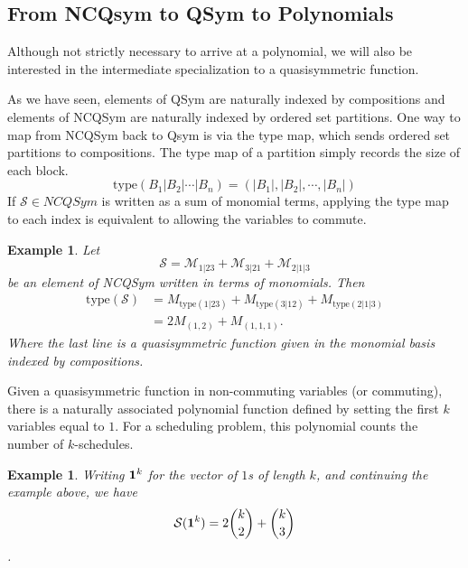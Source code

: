 \documentclass[12pt,reqno]{amsart}
\numberwithin{definition}{section}
\newtheorem{remark}[definition]{Remark}
\newtheorem{example}[definition]{Example}
\newcommand{\ncM}{\mathcal{M}}
\begin{document}


\subsection{From NCQsym to QSym to Polynomials}
Although not strictly necessary to arrive at a polynomial, we will also be interested in the intermediate specialization to a quasisymmetric function.  


As we have seen, elements of QSym are naturally indexed by
compositions and elements of NCQSym are naturally indexed by ordered
set partitions.  
One way to map from NCQSym back to Qsym is via the type map, which sends ordered set partitions to compositions.
The type map of a partition simply records the size of each block.
$$\textrm{type}(B_1|B_2|\cdots|B_n) = (|B_1|, |B_2|, \cdots, |B_n|)$$
If $\mathcal{S} \in NCQSym$ is written as a sum of monomial terms,
applying the type map to each index is equivalent to allowing the
variables to commute.

\begin{example}
Let $$\mathcal{S} = \ncM_{1|23} + \ncM_{3|21} + \ncM_{2|1|3}$$ be an element of NCQSym written in terms of monomials.  Then 
\begin{align*}
\textrm{type}(\mathcal{S}) & =  M_{\textrm{type} (1|23)} + M_{\textrm{type} (3|12)} + M_{\textrm{type} (2|1|3)} \\
&  = 2 M_{(1,2)} + M_{(1,1,1)}.
\end{align*}
 Where the last line is a quasisymmetric function given in the monomial basis indexed by compositions.  
\end{example}



Given a quasisymmetric function in non-commuting variables (or
commuting), there is a naturally associated polynomial function
defined by setting the first $k$ variables equal to $1$.  For a scheduling problem, this polynomial counts the number of $k$-schedules.  

\begin{example}
Writing ${\bf 1}^k$ for the vector of $1$s of length $k$, and continuing the example above, we have 
$$ \mathcal{S}({\bf 1}^k) = 2 {k \choose 2} + {k \choose 3}$$.  
\end{example}
\end{document}
